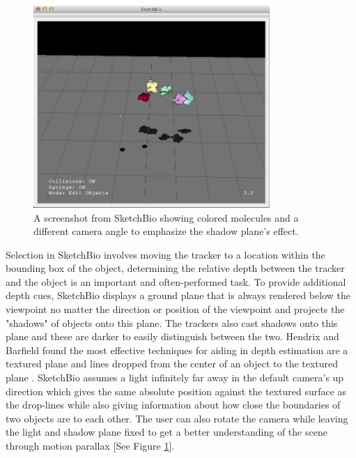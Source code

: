 \documentclass{article} %
\begin{document}
\begin{figure}[h]
\centering
\includegraphics[width=0.8\textwidth]{shadow_plane.png}
\caption{A screenshot from SketchBio showing colored molecules and a different camera angle to emphasize the shadow plane's effect.}
\label{fig:shadow_plane}
\end{figure}

Selection in SketchBio involves moving the tracker to a location within the bounding box of the object, determining the relative depth between the tracker and the object is an important and often-performed task.  To provide additional depth cues, SketchBio displays a ground plane that is always rendered below the viewpoint no matter the direction or position of the viewpoint and projects the "shadows" of objects onto this plane.  The trackers also cast shadows onto this plane and these are darker to easily distinguish between the two.  Hendrix and Barfield found the most effective techniques for aiding in depth estimation are a textured plane and lines dropped from the center of an object to the textured plane \cite{Hendrix1995103}.  SketchBio assumes a light infinitely far away in the default camera's up direction which gives the same absolute position against the textured surface as the drop-lines while also giving information about how close the boundaries of two objects are to each other.  The user can also rotate the camera while leaving the light and shadow plane fixed to get a better understanding of the scene through motion parallax [See Figure \ref{fig:shadow_plane}].
\end{document}
